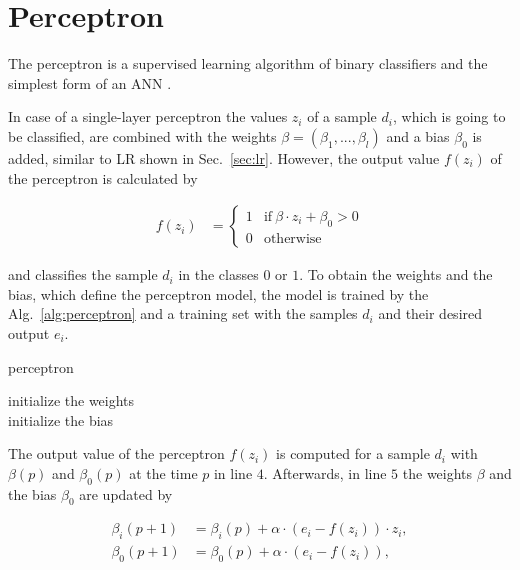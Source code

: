 \section{Perceptron}
\label{sec:perceptron}

The perceptron is a supervised learning algorithm of binary classifiers and the simplest form of an \ac{ANN} \cite{Rosenblatt1957TheAutomaton}. 

In case of a single-layer perceptron the values $z_i$ of a sample $d_i$, which is going to be classified, are combined with the weights $\beta =(\beta_1, ..., \beta_l)$ and a bias $\beta_0$ is added, similar to \ac{LR} shown in Sec.\ \ref{sec:lr}.
However, the output value $f(z_i)$ of the perceptron is calculated by

\begin{align*}
f(z_i) &= \begin{cases}
1 & \text{if}\ \beta \cdot z_i + \beta_0 > 0\\
0 & \text{otherwise}
\end{cases}
\end{align*}

and classifies the sample $d_i$ in the classes $0$ or $1$.
To obtain the weights and the bias, which define the perceptron model, the model is trained by the Alg.\ \ref{alg:perceptron} and a training set with the samples $d_i$ and their desired output $e_i$.

\SetAlCapHSkip{0.2em}
\begin{algorithm}[H]
\Indm
\SetAlgoLined
\caption{perceptron}
\label{alg:perceptron}
\Indp

initialize the weights\\ %
initialize the bias\\ %

\end{algorithm}

The output value of the perceptron $f(z_i)$ is computed for a sample $d_i$ with $\beta(p)$ and $\beta_0(p)$ at the time $p$ in line $4$.
Afterwards, in line $5$ the weights $\beta$ and the bias $\beta_0$ are updated by

\begin{align*}
\beta_i(p+1) &= \beta_i(p) + \alpha \cdot (e_i - f(z_i)) \cdot z_i,\\
\beta_0(p+1) &= \beta_0(p) + \alpha \cdot (e_i - f(z_i)),
\end{align*}

